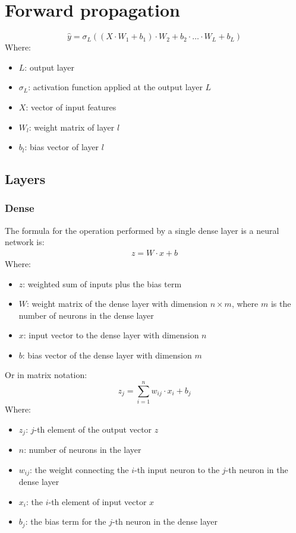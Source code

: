 \documentclass[a4paper]{report}
\newcommand{\haty}{\hat{y}}
\begin{document}
\section{Forward propagation}

\begin{equation*}
    \haty = \sigma_L((X \cdot W_1+b_1) \cdot W_2 + b_2 \cdot \ldots \cdot W_L + b_L)
\end{equation*}
Where:
\begin{itemize}
    \item $L$: output layer
    \item $\sigma_L$: activation function applied at the output layer $L$
    \item $X$: vector of input features
    \item $W_l$: weight matrix of layer $l$
    \item $b_l$: bias vector of layer $l$
\end{itemize}

\subsection{Layers}

\subsubsection*{Dense}
The formula for the operation performed by a single dense layer is a neural network is:
\begin{align*}
    z = W \cdot x + b
\end{align*}
Where:
\begin{itemize}
    \item $z$: weighted sum of inputs plus the bias term
    \item $W$: weight matrix of the dense layer with dimension $n \times m$, where $m$ is the number of neurons in the dense layer
    \item $x$: input vector to the dense layer with dimension $n$
    \item $b$: bias vector of the dense layer with dimension $m$
\end{itemize}

Or in matrix notation:
\begin{equation*}
    z_j = \sum_{i=1}^{n} w_{ij} \cdot x_i + b_j
\end{equation*}
Where:
\begin{itemize}
    \item $z_j$: $j$-th element of the output vector $z$
    \item $n$: number of neurons in the layer
    \item $w_{ij}$: the weight connecting the $i$-th input neuron to the $j$-th neuron in the dense layer
    \item $x_i$: the $i$-th element of input vector $x$
    \item $b_j$: the bias term for the $j$-th neuron in the dense layer
\end{itemize}
\end{document}
